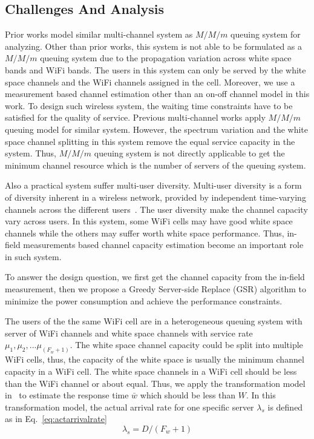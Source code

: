 \subsection{Challenges And Analysis}
\label{subsec:challenge}

Prior works model similar multi-channel system as $M/M/m$ queuing system for analyzing.
Other than prior works, this system is not able to be formulated as a $M/M/m$ queuing system due to the 
propagation variation across white space bands and WiFi bands. The users in this system can only be 
served by the white space channels and the WiFi channels assigned in the cell. 
Moreover, we use a measurement based channel estimation other than an on-off channel model in 
this work. 
To design such wireless system, the waiting time constraints have to be satisfied for the quality of service. 
Previous multi-channel works apply $M/M/m$ queuing model for similar system. However, the spectrum 
variation and the white space channel splitting in this system remove the equal service capacity in the system.
Thus, $M/M/m$ queuing system is not directly applicable to get the minimum channel resource which is the
number of servers of the queuing system. 

Also a practical system suffer multi-user diversity.
Multi-user diversity is a form of diversity inherent in a wireless network, provided by 
independent time-varying channels across the different users~\cite{viswanath2002opportunistic}.
The user diversity make the channel capacity vary across users. In this system, some WiFi cells may 
have good white space channels while the others may suffer worth white space performance. 
Thus, in-field measurements based channel capacity estimation become an important role in such system.


To answer the design question, we first get the channel capacity from the in-field measurement, then we 
propose a Greedy Server-side Replace (GSR) algorithm to minimize the power consumption and achieve the 
performance constraints.


The users of the the same WiFi cell are in a heterogeneous queuing system with server of 
WiFi channels and white space channels with service rate $\mu_1,\mu_2,...\mu_{(F_w+1)}$.
The white space channel capacity could be split into multiple WiFi cells, thus, the 
capacity of the white space is usually the minimum channel capacity in a WiFi cell.
The white space channels in a WiFi cell should be less than the WiFi channel or about equal. 
Thus, we apply the transformation model in~\cite{yu2008transformation} to estimate the response 
time $\bar{w}$ which should be less than $W$.
In this transformation model, the actual arrival rate for one specific server $\lambda_s$ is defined as in 
Eq.~\ref{eq:actarrivalrate}
\begin{equation}
\label{eq:actarrivalrate}
\lambda_s=D/(F_w+1)
\end{equation}

